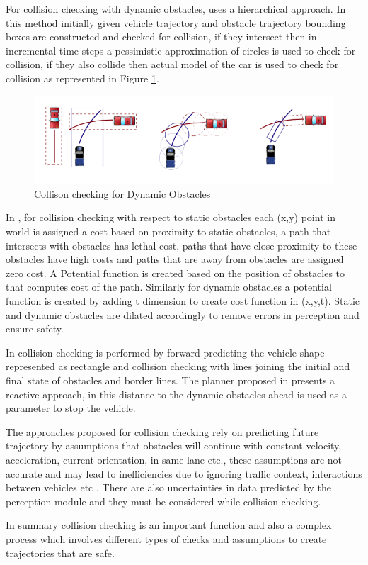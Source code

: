 For collision checking with dynamic obstacles, \cite{kolski_thesis} uses a hierarchical approach. In this method initially given vehicle trajectory and obstacle trajectory bounding boxes are constructed and checked for collision, if they intersect then in incremental time steps a pessimistic approximation of circles is used to check for collision, if they also collide then actual model of the car is used to check for collision as represented in Figure \ref{kolskidynamicobst}.

\begin{figure}
	\centering
	\includegraphics[width=1.0\textwidth]{Images/related_work/kolskidynamicobstacles.png}
	\caption{Collison checking for Dynamic Obstacles \cite{kolski_thesis}}
	\label{kolskidynamicobst}
\end{figure} 

In \cite{cmu_parallel_thesis}, for collision checking with respect to static obstacles each (x,y) point in world is assigned a cost based on proximity to static obstacles, a path that intersects with obstacles has lethal cost, paths that have close proximity to these obstacles have high costs and paths that are away from obstacles are assigned zero cost. A Potential function is created based on the position of obstacles to that computes cost of the path. Similarly for dynamic obstacles a potential function is created by adding t dimension to create cost function in (x,y,t). Static and dynamic obstacles are dilated accordingly to remove errors in perception and ensure safety.  

In \cite{rrt_star} collision checking is performed by forward predicting the vehicle shape represented as rectangle and collision checking with lines joining the initial and final state of obstacles and border lines. The planner proposed in \cite{volvo_reactive_traj} presents a reactive approach, in this distance to the dynamic obstacles ahead is used as a parameter to stop the vehicle. 

The approaches proposed for collision checking rely on predicting future trajectory by assumptions that obstacles will continue with constant velocity, acceleration, current orientation, in same lane etc., these assumptions are not accurate and may lead to inefficiencies due to ignoring traffic context, interactions between vehicles etc \cite{motion_planning_techniques}. There are also uncertainties in data predicted by the perception module and they must be considered while collision checking.

In summary collision checking is an important function and also a complex process which involves different types of checks and assumptions to create trajectories that are safe.

